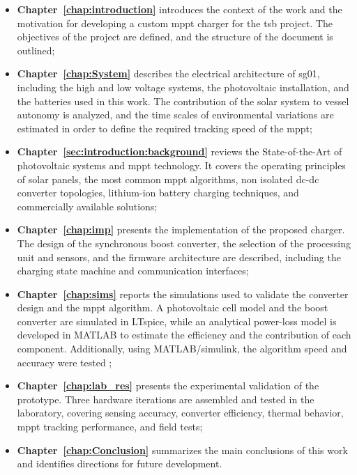 \begin{itemize}[leftmargin=4em, itemsep=1pt, topsep=2pt]
    \item \textbf{Chapter~\ref{chap:introduction}} introduces the context of the work and the motivation for developing a custom \acs{mppt} charger for the \acs{tsb} project. The objectives of the project are defined, and the structure of the document is outlined;

    \item \textbf{Chapter~\ref{chap:System}} describes the electrical architecture of \acs{sg01}, including the high and low voltage systems, the photovoltaic installation, and the batteries used in this work. The contribution of the solar system to vessel autonomy is analyzed, and the time scales of environmental variations are estimated in order to define the required tracking speed of the \acs{mppt};

    \item \textbf{Chapter~\ref{sec:introduction:background}} reviews the State-of-the-Art of photovoltaic systems and \acs{mppt} technology. It covers the operating principles of solar panels, the most common \acs{mppt} algorithms, non isolated \acs{dc}-\acs{dc} converter topologies, lithium-ion battery charging techniques, and commercially available solutions;

    \item \textbf{Chapter~\ref{chap:imp}} presents the implementation of the proposed charger. The design of the synchronous boost converter, the selection of the processing unit and sensors, and the firmware architecture are described, including the charging state machine and communication interfaces;

    \item \textbf{Chapter~\ref{chap:sims}} reports the simulations used to validate the converter design and the \acs{mppt} algorithm. A photovoltaic cell model and the boost converter are simulated in LTspice, while an analytical power-loss model is developed in MATLAB to estimate the efficiency and the contribution of each component. Additionally, using MATLAB/simulink, the algorithm speed and accuracy were tested ;

    \item \textbf{Chapter~\ref{chap:lab_res}} presents the experimental validation of the prototype. Three hardware iterations are assembled and tested in the laboratory, covering sensing accuracy, converter efficiency, thermal behavior, \acs{mppt} tracking performance, and field tests;

    \item \textbf{Chapter~\ref{chap:Conclusion}} summarizes the main conclusions of this work and identifies directions for future development.
\end{itemize}
    